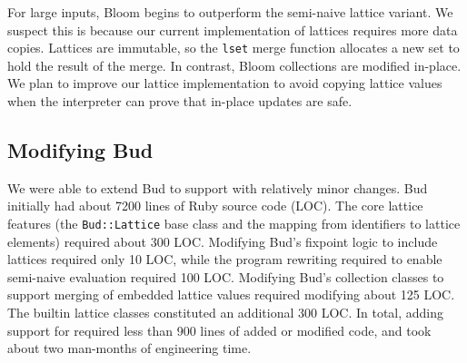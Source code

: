 For large inputs, Bloom begins to outperform the semi-naive lattice variant. We
suspect this is because our current implementation of lattices requires more
data copies. Lattices are immutable, so the \texttt{lset} merge function
allocates a new set to hold the result of the merge. In contrast, Bloom
collections are modified in-place. We plan to improve our lattice implementation
to avoid copying lattice values when the interpreter can prove that in-place
updates are safe.

\subsection{Modifying Bud}
We were able to extend Bud to support \lang with relatively minor changes. Bud
initially had about 7200 lines of Ruby source code (LOC). The core lattice
features (the \texttt{Bud::Lattice} base class and the mapping from identifiers
to lattice elements) required about 300 LOC. Modifying Bud's fixpoint logic to
include lattices required only 10 LOC, while the program rewriting required to
enable semi-naive evaluation required 100 LOC. Modifying Bud's collection
classes to support merging of embedded lattice values required modifying about
125 LOC. The builtin lattice classes constituted an additional 300 LOC. In
total, adding support for \lang required less than 900 lines of added or
modified code, and took about two man-months of engineering time.%
